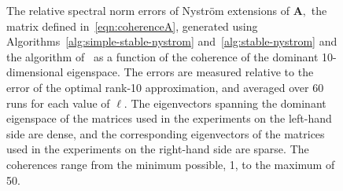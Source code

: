 \documentclass[11pt,letterpaper,twoside,reqno,nosumlimits]{amsart}
\newcommand{\mat}[1]{\ensuremath{\mathbf{#1}}}
\theoremstyle{remark}
\begin{document}
\begin{figure}[htb!]
\centering



\caption{The relative spectral norm errors of Nystr\"om extensions of $\mat{A},$ the matrix defined in~\eqref{eqn:coherenceA}, generated using Algorithms~\ref{alg:simple-stable-nystrom} and~\ref{alg:stable-nystrom} and the algorithm of~\cite{CD11} as a function of the coherence of the dominant 10-dimensional eigenspace. The errors are measured relative to the error of the optimal rank-10 approximation, and averaged over 60 runs for each value of $\ell.$ The eigenvectors spanning the dominant eigenspace of the matrices used in the experiments on the left-hand side are dense, and the corresponding eigenvectors of the matrices used in the experiments on the right-hand side are sparse. The coherences range from the minimum possible, 1, to the maximum of 50.}
\label{fig:vary-coherence}
\end{figure}
\end{document}
